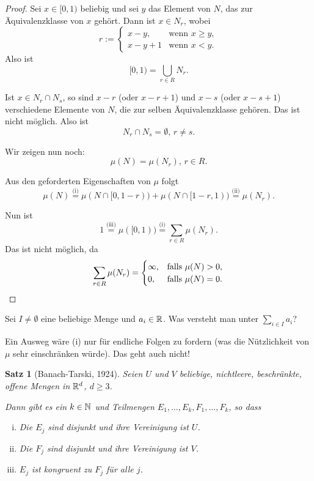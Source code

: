 \documentclass[
 a4paper,
 12pt,
 parskip=half
 ]{scrreprt}
\theoremstyle{plain}
\newtheorem{thm}{Satz}[section] %
\theoremstyle{definition}
\numberwithin{equation}{section}
\begin{document}
\begin{proof}
 Sei $x \in [0,1)$ beliebig und sei $y$ das Element von $N$, das zur Äquivalenzklasse von $x$ gehört. Dann ist $x \in N_r$, wobei 
 \[ r := \begin{cases}
          x-y, & \text{wenn } x \ge y, \\
          x-y+1 & \text{wenn } x < y.
         \end{cases} \]
 Also ist
 \[ [0,1) = \bigcup_{r \in R} N_r. \]
 
 Ist $x \in N_r \cap N_s$, so sind $x-r$ (oder $x-r+1$) und $x-s$ (oder $x-s+1$) verschiedene Elemente von $N$, die zur selben Äquivalenzklasse gehören. Das ist nicht möglich. Also ist
 \[ N_r \cap N_s = \emptyset,\, r \ne s. \]

 Wir zeigen nun noch:
 \[ \mu( N ) = \mu(N_r),\, r \in R. \]

 Aus den geforderten Eigenschaften von $\mu$ folgt
 \[ \mu(N) \overset{\text{(i)}}{=} \mu( N \cap [0,1-r) ) + \mu( N \cap [1-r, 1) ) \overset{\text{(ii)}}{=} \mu(N_r). \] 
 
 Nun ist
 \[ 1 \overset{\text{(iii)}}{=} \mu( [0,1) ) \overset{\text{(i)}}{=} \sum_{r \in R} \mu( N_r ). \]
 Das ist nicht möglich, da
 \[ \sum_{r \in R} \mu( N_r ) = 
   \begin{cases}
    \infty, & \text{falls } \mu(N) > 0, \\
    0, & \text{falls } \mu(N) = 0.
   \end{cases} \qedhere \]
\end{proof}

Sei $I \ne \emptyset$ eine beliebige Menge und $a_i \in \mathbb{R}$. Was versteht man unter $\sum_{i \in I} a_i$?

Ein Ausweg wäre (i) nur für endliche Folgen zu fordern (was die Nützlichkeit von $\mu$ sehr einschränken würde). Das geht auch nicht!

\begin{thm}[Banach-Tarski, 1924]
 Seien $U$ und $V$ beliebige, nichtleere, beschränkte, offene Mengen in $\mathbb{R}^d$, $d \ge 3$.
 
 Dann gibt es ein $k \in \mathbb{N}$ und Teilmengen $E_1, \ldots, E_k, F_1, \ldots, F_k$, so dass
 \begin{enumerate}[(i)]
  \item Die $E_j$ sind disjunkt und ihre Vereinigung ist $U$.
  \item Die $F_j$ sind disjunkt und ihre Vereinigung ist $V$.
  \item $E_j$ ist kongruent zu $F_j$ für alle $j$.
 \end{enumerate}
\end{thm}
\end{document}
